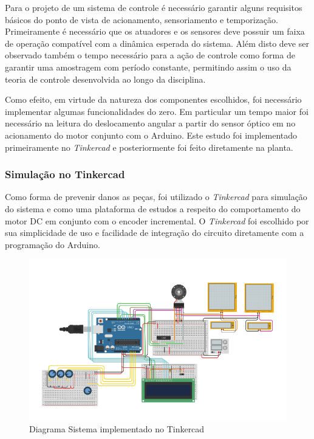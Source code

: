 \documentclass[a4paper,11pt]{article}
\begin{document}
Para o projeto de um sistema de controle é necessário garantir alguns requisitos básicos do ponto de vista de acionamento, sensoriamento e temporização. Primeiramente é necessário que os atuadores e os sensores deve possuir um faixa de operação compatível com a dinâmica esperada do sistema. Além disto deve ser observado também o tempo necessário para a ação de controle como forma de garantir uma amostragem com período constante, permitindo assim o uso da teoria de controle desenvolvida ao longo da disciplina.

Como efeito, em virtude da natureza dos componentes escolhidos, foi necessário implementar algumas funcionalidades do zero. Em particular um tempo maior foi necessário na leitura do deslocamento angular a partir do sensor óptico em no acionamento do motor conjunto com o Arduino. Este estudo foi implementado primeiramente no \textit{Tinkercad} e posteriormente foi feito diretamente na planta.

\subsubsection{Simulação no Tinkercad}

Como forma de prevenir danos as peças, foi utilizado o \textit{Tinkercad} para simulação do sistema e como uma plataforma de estudos a respeito do comportamento do motor DC em conjunto com o encoder incremental. O \textit{Tinkercad} foi escolhido por sua simplicidade de uso e facilidade de integração do circuito diretamente com a programação do Arduino.

\begin{figure}[H]
    \centering
    \includegraphics[width=\linewidth]{src/tex/img/pid_tinkercad.png}
    \caption{Diagrama Sistema implementado no Tinkercad}
    \label{fig:pid_tinkercad}
\end{figure}
\end{document}
